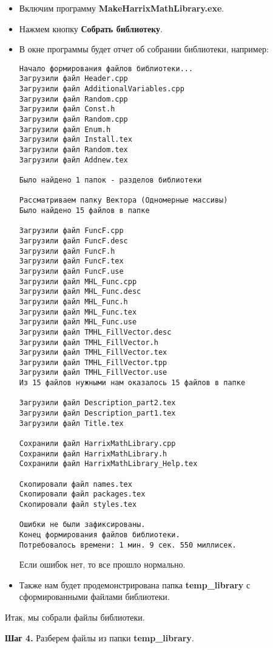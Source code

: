 \begin{itemize}
\item Включим программу \textbf{MakeHarrixMathLibrary.exe}.
\item Нажмем кнопку \textbf{Собрать библиотеку}.
\item В окне программы будет отчет об собрании библиотеки, например:
\begin{lstlisting}[label=examplereport, caption=Пример отчета о сборке библиотеки]
Начало формирования файлов библиотеки...
Загрузили файл Header.cpp
Загрузили файл AdditionalVariables.cpp
Загрузили файл Random.cpp
Загрузили файл Const.h
Загрузили файл Random.cpp
Загрузили файл Enum.h
Загрузили файл Install.tex
Загрузили файл Random.tex
Загрузили файл Addnew.tex

Было найдено 1 папок - разделов библиотеки

Рассматриваем папку Вектора (Одномерные массивы)
Было найдено 15 файлов в папке

Загрузили файл FuncF.cpp
Загрузили файл FuncF.desc
Загрузили файл FuncF.h
Загрузили файл FuncF.tex
Загрузили файл FuncF.use
Загрузили файл MHL_Func.cpp
Загрузили файл MHL_Func.desc
Загрузили файл MHL_Func.h
Загрузили файл MHL_Func.tex
Загрузили файл MHL_Func.use
Загрузили файл TMHL_FillVector.desc
Загрузили файл TMHL_FillVector.h
Загрузили файл TMHL_FillVector.tex
Загрузили файл TMHL_FillVector.tpp
Загрузили файл TMHL_FillVector.use
Из 15 файлов нужными нам оказалось 15 файлов в папке

Загрузили файл Description_part2.tex
Загрузили файл Description_part1.tex
Загрузили файл Title.tex

Сохранили файл HarrixMathLibrary.cpp
Сохранили файл HarrixMathLibrary.h
Сохранили файл HarrixMathLibrary_Help.tex

Скопировали файл names.tex
Скопировали файл packages.tex
Скопировали файл styles.tex

Ошибки не были зафиксированы.
Конец формирования файлов библиотеки.
Потребовалось времени: 1 мин. 9 сек. 550 миллисек.
\end{lstlisting}

Если ошибок нет, то все прошло нормально.
\item Также нам будет продемонстрирована папка \textbf{temp\_library} с сформированными файлами библиотеки.
\end{itemize}

Итак, мы собрали файлы библиотеки.

\textbf{Шаг 4.}\label{step4} Разберем файлы из папки \textbf{temp\_library}.

